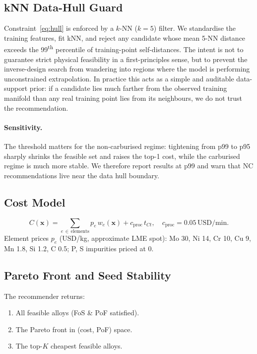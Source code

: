 \documentclass[12pt,a4paper]{article} %
\begin{document}
\subsection{kNN Data-Hull Guard}
Constraint~\eqref{eq:hull} is enforced by a $k$-NN ($k=5$) filter. We standardise the
training features, fit kNN, and reject any candidate whose mean 5-NN distance exceeds the
99\textsuperscript{th} percentile of training-point self-distances.
The intent is not to guarantee strict physical feasibility in a first-principles sense, but
to prevent the inverse-design search from wandering into regions where the model is
performing unconstrained extrapolation. In practice this acts as a simple and auditable
data-support prior: if a candidate lies much farther from the observed training manifold
than any real training point lies from its neighbours, we do not trust the recommendation.

\paragraph{Sensitivity.} The threshold matters for the non-carburised regime:
tightening from p99 to p95 sharply shrinks the feasible set and raises the top-1 cost,
while the carburised regime is much more stable. We therefore report results at p99 and
warn that NC recommendations live near the data hull boundary.

\subsection{Cost Model}\label{sec:cost}
\begin{equation}
  C(\mathbf{x}) = \sum_{e\,\in\,\text{elements}} p_e\,w_e(\mathbf{x})
              + c_{\text{proc}}\,t_{Ct}, \quad c_{\text{proc}} = 0.05\,\text{USD/min}.
\end{equation}
Element prices $p_e$ (USD/kg, approximate LME spot): Mo 30, Ni 14, Cr 10, Cu 9, Mn 1.8,
Si 1.2, C 0.5; P, S impurities priced at 0.

\subsection{Pareto Front and Seed Stability}
The recommender returns:
\begin{enumerate}[nosep]
  \item All feasible alloys (FoS \& PoF satisfied).
  \item The Pareto front in (cost, PoF) space.
  \item The top-$K$ cheapest feasible alloys.
\end{enumerate}
\end{document}
